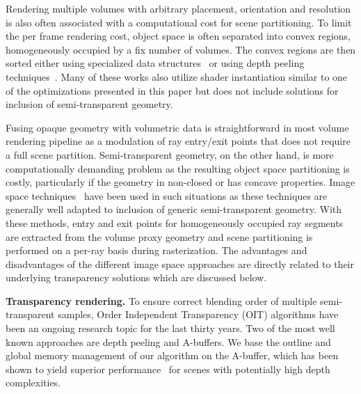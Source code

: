 \documentclass{egpubl}
\newcommand{\ab}{\mbox{A-buffer}}
\begin{document}
Rendering multiple volumes with arbitrary placement, orientation and resolution is also often associated with a computational cost for scene partitioning. 
To limit the per frame rendering cost, object space is often separated into convex regions, homogeneously occupied by a fix number of volumes. 
The convex regions are then sorted either using specialized data structures~\cite{grimm04vobjects,lindholm2009fused,Lux2009} or using depth peeling techniques~\cite{Plate2007,rossler08multishader}. 
Many of these works also utilize shader instantiation similar to one of the optimizations presented in this paper but does not include solutions for inclusion of semi-transparent geometry. 


Fusing opaque geometry with volumetric data is straightforward in most volume rendering pipeline as a modulation of ray entry/exit points that does not require a full scene partition. 
Semi-transparent geometry, on the other hand, is more computationally demanding problem as the resulting object space partitioning is costly, particularly if the geometry in non-closed or has concave properties. 
Image space techniques~\cite{brecheisen08multimodal,kainz2009ray} have been used in such situations as these techniques are generally well adapted to inclusion of generic semi-transparent geometry. 
With these methods, entry and exit points for homogeneously occupied ray segments are extracted from the volume proxy geometry and scene partitioning is performed on a per-ray basis during rasterization.
The advantages and disadvantages of the different image space approaches are directly related to their underlying transparency solutions which are discussed below. 


\noindent\textbf{Transparency rendering.}
%
To ensure correct blending order of multiple semi-transparent samples, Order Independent Transparency (OIT) algorithms have been an ongoing research topic for the last thirty years.
Two of the most well known approaches are depth peeling and \ab{}s. 
We base the outline and global memory management of our algorithm on the \ab, which has been shown to yield superior performance~\cite{Yang2010,Kauker2013} for scenes with potentially high depth complexities. 
\end{document}

